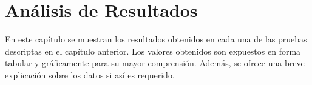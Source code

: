 \chapter{Análisis de Resultados}
\label{chap:analisis}

En este capítulo se muestran los resultados obtenidos en cada una de las pruebas descriptas
en el capítulo anterior. Los valores obtenidos son expuestos en forma tabular y gráficamente para
su mayor comprensión. Además, se ofrece una breve explicación sobre los datos si así es requerido.






